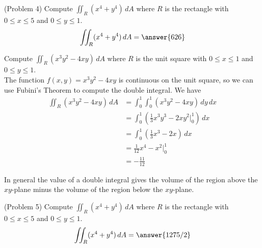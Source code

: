 \documentclass[handout]{ximera}
\begin{document}
\begin{problem}(Problem 4)
Compute $\iint_R (x^4 + y^4) \, dA$ where $R$ is the rectangle with $0 \leq x \leq 5$ and $0 \leq y \leq 1$.\\
\[
\iint_R (x^4 + y^4) \, dA = \answer{626}
\]
\end{problem}

\begin{example}[Example 5]
Compute $\iint_R (x^3y^2 - 4xy) \, dA$ where $R$ is the unit square with $0 \leq x \leq 1$ and $0 \leq y \leq 1$.\\
The function $f(x,y) = x^3y^2 - 4xy$ is continuous on the unit square, so we can use Fubini's Theorem to compute the double integral.
We have
\begin{align*}
\iint_R (x^3y^2 - 4xy) \, dA &= \int_0^1 \int_0^1 (x^3y^2 - 4xy) \, dy\, dx\\
                          &= \int_0^1 \left(\frac13 x^3 y^3  - 2xy^2 \bigg|_0^1 \right) \, dx\\
                          &= \int_0^1 \left(\frac13 x^3 - 2x \right) \, dx\\
                          &= \frac{1}{12} x^4 - x^2 \bigg|_0^1\\
                          &= -\frac{11}{12}
\end{align*}
\end{example}

\begin{remark}
In general the value of a double integral gives the volume of the region above the $xy$-plane minus
the volume of the region below the $xy$-plane.
\end{remark}

\begin{problem}(Problem 5)
Compute $\iint_R (x^4 + y^4) \, dA$ where $R$ is the rectangle with $0 \leq x \leq 5$ and $0 \leq y \leq 1$.\\
\[
\iint_R (x^4 + y^4) \, dA = \answer{1275/2}
\]
\end{problem}
\end{document}
